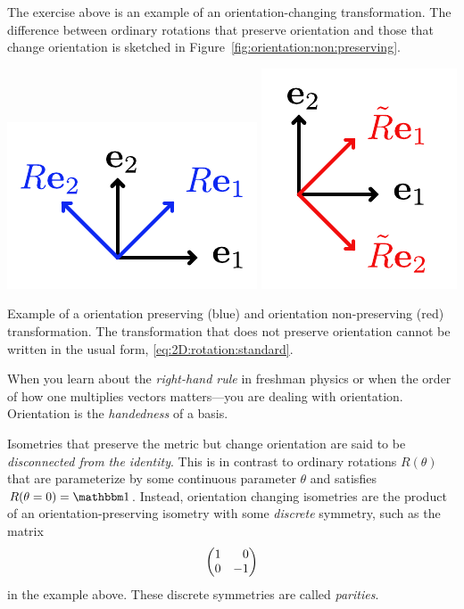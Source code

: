 The exercise above is an example of an orientation-changing transformation. The difference between ordinary rotations that preserve orientation and those that change orientation is sketched in Figure~\ref{fig:orientation:non:preserving}.
\begin{marginfigure}%
    \includegraphics[width=.5\textwidth]{figures/OrientationPreserving.pdf}
    \includegraphics[width=.4\textwidth]{figures/OrientationNonPreserving.pdf}
    \caption{Example of a orientation preserving (blue) and orientation non-preserving (red) transformation. The transformation that does not preserve orientation cannot be written in the usual form, \eqref{eq:2D:rotation:standard}.}
    \label{fig:orientation:non:preserving}
\end{marginfigure}
When you learn about the \emph{right-hand rule} in freshman physics or when the order of how one multiplies vectors matters---you are dealing with orientation. Orientation is the \emph{handedness} of a basis. 

Isometries that preserve the metric but change orientation are said to be \emph{disconnected from the identity}. This is in contrast to ordinary rotations $R(\theta)$ that are parameterize by some continuous parameter $\theta$ and satisfies $R(\theta = 0) = \one$. Instead, orientation changing isometries are the product of an orientation-preserving isometry with some \emph{discrete} symmetry, such as the matrix
\begin{align}
    \begin{pmatrix}
        1 & \pp 0 \\
        0 & -1
    \end{pmatrix}
\end{align}
in the example above. These discrete symmetries are called \emph{parities}. 

